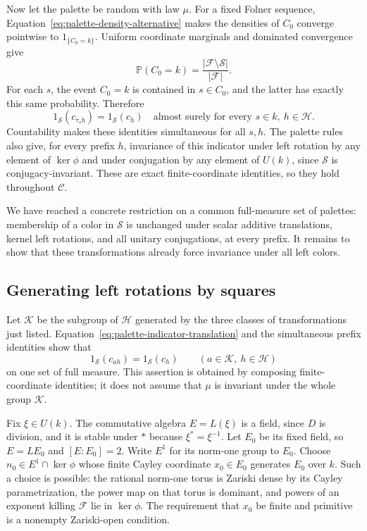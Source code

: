 Now let the palette be random with law $\mu$. For a fixed Folner
sequence, Equation~\ref{eq:palette-density-alternative} makes the
densities of $C_0$ converge pointwise to $1_{\{C_0=k\}}$. Uniform
coordinate marginals and dominated convergence give
\[
 \mathbb P(C_0=k)=\frac{|\mathcal F\setminus\mathcal S|}{|\mathcal F|}.
\]
For each $s$, the event $C_0=k$ is contained in $s\in C_0$, and the
latter has exactly this same probability. Therefore
\begin{equation}\label{eq:palette-indicator-translation}
 1_{\mathcal S}(c_{\tau_sh})=1_{\mathcal S}(c_h)
 \quad\text{almost surely for every }s\in k,\ h\in\mathcal H.
\end{equation}
Countability makes these identities simultaneous for all $s,h$.
The palette rules also give, for every prefix $h$, invariance of this
indicator under left rotation by any element of $\ker\phi$ and under
conjugation by any element of $U(k)$, since $\mathcal S$ is
conjugacy-invariant. These are exact finite-coordinate identities, so
they hold throughout $\mathcal C$.

We have reached a concrete restriction on a common full-measure set of
palettes: membership of a color in $\mathcal S$ is unchanged under
scalar additive translations, kernel left rotations, and all unitary
conjugations, at every prefix. It remains to show that these
transformations already force invariance under all left colors.

\subsection{Generating left rotations by squares}

Let $\mathcal K$ be the subgroup of $\mathcal H$ generated by the three
classes of transformations just listed. Equation~\ref{eq:palette-indicator-translation}
and the simultaneous prefix identities show that
\begin{equation}\label{eq:palette-indicator-generated}
 1_{\mathcal S}(c_{ah})=1_{\mathcal S}(c_h)
 \qquad(a\in\mathcal K,\ h\in\mathcal H)
\end{equation}
on one set of full measure. This assertion is obtained by composing
finite-coordinate identities; it does not assume that $\mu$ is
invariant under the whole group $\mathcal K$.

Fix $\xi\in U(k)$. The commutative algebra $E=L(\xi)$ is a field, since
$D$ is division, and it is stable under $*$ because $\xi^*=\xi^{-1}$.
Let $E_0$ be its fixed field, so $E=LE_0$ and
$[E:E_0]=2$. Write $E^1$ for its norm-one group to $E_0$.
Choose $n_0\in E^1\cap\ker\phi$ whose finite Cayley coordinate
$x_0\in E_0$ generates $E_0$ over $k$. Such a choice is possible:
the rational norm-one torus is Zariski dense by its Cayley
parametrization, the power map on that torus is dominant, and powers
of an exponent killing $\mathcal F$ lie in $\ker\phi$. The requirement
that $x_0$ be finite and primitive is a nonempty Zariski-open condition.


